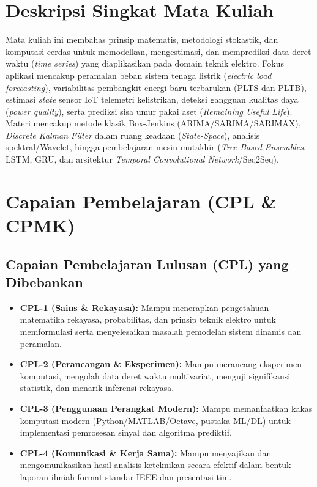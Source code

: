 \documentclass[9.5pt,a4paper]{article}
\begin{document}
\section{Deskripsi Singkat Mata Kuliah}
Mata kuliah ini membahas prinsip matematis, metodologi stokastik, dan komputasi cerdas untuk memodelkan, mengestimasi, dan memprediksi data deret waktu (\textit{time series}) yang diaplikasikan pada domain teknik elektro. Fokus aplikasi mencakup peramalan beban sistem tenaga listrik (\textit{electric load forecasting}), variabilitas pembangkit energi baru terbarukan (PLTS dan PLTB), estimasi \textit{state} sensor IoT telemetri kelistrikan, deteksi gangguan kualitas daya (\textit{power quality}), serta prediksi sisa umur pakai aset (\textit{Remaining Useful Life}). Materi mencakup metode klasik Box-Jenkins (ARIMA/SARIMA/SARIMAX), \textit{Discrete Kalman Filter} dalam ruang keadaan (\textit{State-Space}), analisis spektral/Wavelet, hingga pembelajaran mesin mutakhir (\textit{Tree-Based Ensembles}, LSTM, GRU, dan arsitektur \textit{Temporal Convolutional Network}/Seq2Seq).

\section{Capaian Pembelajaran (CPL \& CPMK)}

\subsection{Capaian Pembelajaran Lulusan (CPL) yang Dibebankan}
\begin{itemize}
    \item \textbf{CPL-1 (Sains \& Rekayasa):} Mampu menerapkan pengetahuan matematika rekayasa, probabilitas, dan prinsip teknik elektro untuk memformulasi serta menyelesaikan masalah pemodelan sistem dinamis dan peramalan.
    \item \textbf{CPL-2 (Perancangan \& Eksperimen):} Mampu merancang eksperimen komputasi, mengolah data deret waktu multivariat, menguji signifikansi statistik, dan menarik inferensi rekayasa.
    \item \textbf{CPL-3 (Penggunaan Perangkat Modern):} Mampu memanfaatkan kakas komputasi modern (Python/MATLAB/Octave, pustaka ML/DL) untuk implementasi pemrosesan sinyal dan algoritma prediktif.
    \item \textbf{CPL-4 (Komunikasi \& Kerja Sama):} Mampu menyajikan dan mengomunikasikan hasil analisis keteknikan secara efektif dalam bentuk laporan ilmiah format standar IEEE dan presentasi tim.
\end{itemize}
\end{document}
